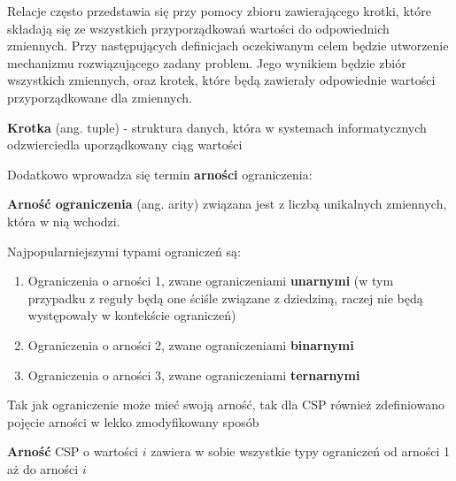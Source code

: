     Relacje często przedstawia się przy pomocy zbioru zawierającego krotki, które składają się ze wszystkich 
    przyporządkowań wartości do odpowiednich zmiennych.
    Przy następujących definicjach oczekiwanym celem będzie utworzenie mechanizmu rozwiązującego zadany problem. Jego wynikiem 
    będzie zbiór wszystkich zmiennych, oraz krotek, które będą zawierały odpowiednie wartości przyporządkowane dla zmiennych.
    \begin{definition}
        \label{Krotka}
        \textbf{Krotka} (ang. tuple) - struktura danych, która w systemach informatycznych odzwierciedla uporządkowany ciąg wartości
    \end{definition}
    Dodatkowo wprowadza się termin \textbf{arności} ograniczenia:
    \begin{definition}
        \label{Krotka}
        \textbf{Arność ograniczenia} (ang. arity)  związana jest z liczbą unikalnych zmiennych, która w nią wchodzi.
    \end{definition}
    Najpopularniejszymi typami ograniczeń są:
    \begin{enumerate}
        \item Ograniczenia o arności 1, zwane ograniczeniami \textbf{unarnymi} (w tym przypadku z reguły będą one ściśle związane z dziedziną, raczej 
        nie będą występowały w kontekście ograniczeń)
        \item Ograniczenia o arności 2, zwane ograniczeniami \textbf{binarnymi}
        \item Ograniczenia o arności 3, zwane ograniczeniami \textbf{ternarnymi}
    \end{enumerate} 

    Tak jak ograniczenie może mieć swoją arność, tak dla CSP również zdefiniowano pojęcie arności w lekko zmodyfikowany sposób 
    \begin{definition}
        \textbf{Arność} CSP o wartości $i$ zawiera w sobie wszystkie typy ograniczeń od arności 1 aż do arności $i$
    \end{definition}

